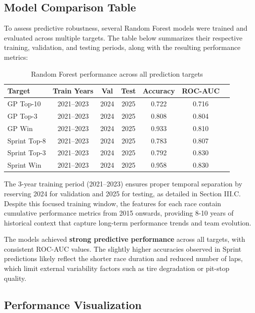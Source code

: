 \documentclass[11pt,a4paper]{article}
\begin{document}
\subsection{Model Comparison Table}
\label{subsec:comparison}

To assess predictive robustness, several Random Forest models were trained and evaluated across multiple targets. The table below summarizes their respective training, validation, and testing periods, along with the resulting performance metrics:

\begin{table}[H]
\centering
\small
\begin{tabular}{lcccccc}
\hline
\textbf{Target} & \textbf{Train Years} & \textbf{Val} & \textbf{Test} & \textbf{Accuracy} & \textbf{ROC-AUC} \\
\hline
GP Top-10 & 2021--2023 & 2024 & 2025 & 0.722 & 0.716 \\
GP Top-3 & 2021--2023 & 2024 & 2025 & 0.808 & 0.804 \\
GP Win & 2021--2023 & 2024 & 2025 & 0.933 & 0.810 \\
Sprint Top-8 & 2021--2023 & 2024 & 2025 & 0.783 & 0.807 \\
Sprint Top-3 & 2021--2023 & 2024 & 2025 & 0.792 & 0.830 \\
Sprint Win & 2021--2023 & 2024 & 2025 & 0.958 & 0.830 \\
\hline
\end{tabular}
\caption{Random Forest performance across all prediction targets}
\label{tab:rf_metrics}
\end{table}

The 3-year training period (2021–2023) ensures proper temporal separation by reserving 2024 for validation and 2025 for testing, as detailed in Section III.C. Despite this focused training window, the features for each race contain cumulative performance metrics from 2015 onwards, providing 8-10 years of historical context that capture long-term performance trends and team evolution.

The models achieved \textbf{strong predictive performance} across all targets, with consistent ROC-AUC values. The slightly higher accuracies observed in Sprint predictions likely reflect the shorter race duration and reduced number of laps, which limit external variability factors such as tire degradation or pit-stop quality.

\subsection{Performance Visualization}
\label{subsec:visualization}
\end{document}
